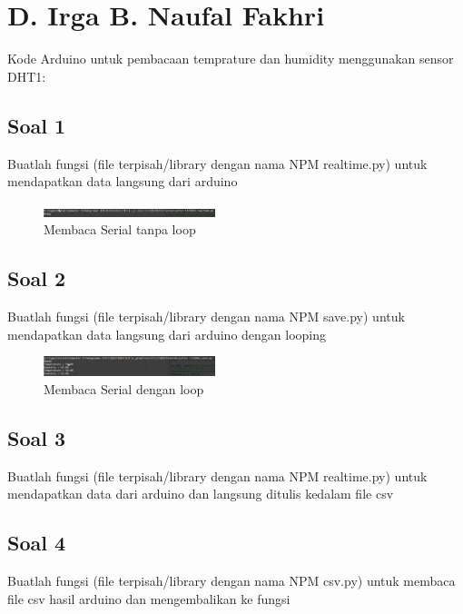 \section{D. Irga B. Naufal Fakhri}
Kode Arduino untuk pembacaan temprature dan humidity menggunakan sensor DHT1:


\subsection{Soal 1}
Buatlah fungsi (file terpisah/library dengan nama NPM realtime.py) untuk mendapatkan data langsung dari arduino

\begin{figure}[ht!]
	\includegraphics[width=5cm]{figures/5/1174066/p1.jpg}
	\centering
	\caption{Membaca Serial tanpa loop}
\end{figure}

\subsection{Soal 2}
Buatlah fungsi (file terpisah/library dengan nama NPM save.py) untuk mendapatkan data langsung dari arduino dengan looping

\begin{figure}[ht!]
	\includegraphics[width=5cm]{figures/5/1174066/p2.jpg}
	\centering
	\caption{Membaca Serial dengan loop}
\end{figure}

\subsection{Soal 3}
Buatlah fungsi (file terpisah/library dengan nama NPM realtime.py) untuk mendapatkan data dari arduino dan langsung ditulis kedalam file csv



\subsection{Soal 4}
Buatlah fungsi (file terpisah/library dengan nama NPM csv.py) untuk membaca file csv hasil arduino dan mengembalikan ke fungsi


